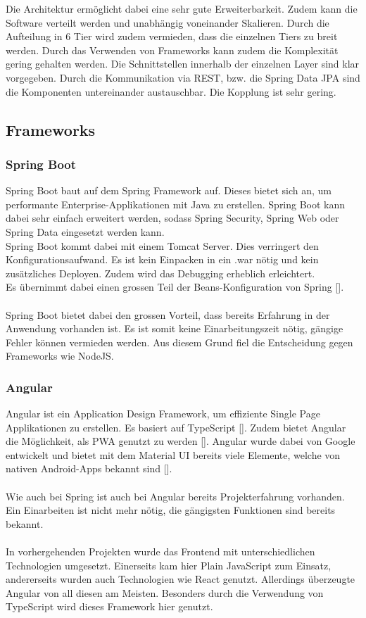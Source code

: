 Die Architektur ermöglicht dabei eine sehr gute Erweiterbarkeit. Zudem kann die Software verteilt werden und unabhängig voneinander Skalieren. Durch die Aufteilung in 6 Tier wird zudem vermieden, dass die einzelnen Tiers zu breit werden. Durch das Verwenden von Frameworks kann zudem die Komplexität gering gehalten werden. Die Schnittstellen innerhalb der einzelnen Layer sind klar vorgegeben. Durch die Kommunikation via REST, bzw. die Spring Data JPA sind die Komponenten untereinander austauschbar. Die Kopplung ist sehr gering. 

\subsection{Frameworks}
\subsubsection{Spring Boot}
Spring Boot baut auf dem Spring Framework auf. Dieses bietet sich an, um performante Enterprise-Applikationen mit Java zu erstellen. Spring Boot kann dabei sehr einfach erweitert werden, sodass Spring Security, Spring Web oder Spring Data eingesetzt werden kann.\\
Spring Boot kommt dabei mit einem Tomcat Server. Dies verringert den Konfigurationsaufwand. Es ist kein Einpacken in ein .war nötig und kein zusätzliches Deployen. Zudem wird das Debugging erheblich erleichtert.  \\
Es übernimmt dabei einen grossen Teil der Beans-Konfiguration von Spring [\cite{springBoot}].\\\\
Spring Boot bietet dabei den grossen Vorteil, dass bereits Erfahrung in der Anwendung vorhanden ist. Es ist somit keine Einarbeitungszeit nötig, gängige Fehler können vermieden werden. Aus diesem Grund fiel die Entscheidung gegen Frameworks wie NodeJS. 

\subsubsection{Angular}
Angular ist ein Application Design Framework, um effiziente Single Page Applikationen zu erstellen. Es basiert auf TypeScript [\cite{angular}]. Zudem bietet Angular die Möglichkeit, als \ac{PWA} genutzt zu werden [\cite{angularPWA}]. 
Angular wurde dabei von Google entwickelt und bietet mit dem Material UI bereits viele Elemente, welche von nativen Android-Apps bekannt sind [\cite{angularMaterialUI}]. \\\\
Wie auch bei Spring ist auch bei Angular bereits Projekterfahrung vorhanden. Ein Einarbeiten ist nicht mehr nötig, die gängigsten Funktionen sind bereits bekannt. \\\\
In vorhergehenden Projekten wurde das Frontend mit unterschiedlichen Technologien umgesetzt. Einerseits kam hier Plain JavaScript zum Einsatz, andererseits wurden auch Technologien wie \gls{React} genutzt. Allerdings überzeugte Angular von all diesen am Meisten. Besonders durch die Verwendung von TypeScript wird dieses Framework hier genutzt. 

